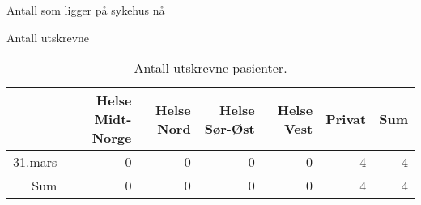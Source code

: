 \documentclass[handout, xcolor=pdftex,dvipsnames,table]{beamer}\usepackage[]{graphicx}\usepackage[]{color}
\begin{document}
\begin{tiny}
\begin{frame}[fragile] {Antall som ligger på sykehus nå}
\end{frame}

\begin{frame}[fragile] {Antall utskrevne}

\begin{table}[ht]
\centering
\begin{tabular}{rrrrrrr}
  \hline
 & Helse Midt-Norge & Helse Nord & Helse Sør-Øst & Helse Vest & Privat & Sum \\ 
  \hline
31.mars & 0 & 0 & 0 & 0 & 4 & 4 \\ 
  Sum & 0 & 0 & 0 & 0 & 4 & 4 \\ 
   \hline
\end{tabular}
\caption{Antall utskrevne pasienter.} 
\end{table}

\end{frame}


\end{tiny}
\end{document}
